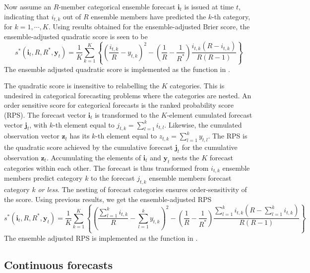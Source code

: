 \documentclass[article]{jss}
\begin{document}
Now assume an $R$-member categorical ensemble forecast $\mathbf{i}_t$ is issued at time $t$, indicating that $i_{t,k}$ out of $R$ ensemble members have predicted the $k$-th category, for $k=1,\cdots,K$.
Using results obtained for the ensemble-adjusted Brier score, the ensemble-adjusted quadratic score is seen to be
%
\begin{equation}
s^*(\mathbf{i}_t, R, R^*, \mathbf{y}_t) = \frac{1}{K} \sum_{k=1}^K \left\{ \left(\frac{i_{t,k}}{R} - y_{t,k}\right)^2 - \left(\frac{1}{R} - \frac{1}{R^*}\right) \frac{i_{t,k}(R-i_{t,k})}{R(R-1)}\right\}
\end{equation}
%
The ensemble adjusted quadratic score is implemented as the function  in .


The quadratic score is insensitive to relabelling the $K$ categories.
This is undesired in categorical forecasting problems where the categories are nested.
An order sensitive score for categorical forecasts is the ranked probability score (RPS).
The forecast vector $\mathbf{i}_t$ is transformed to the $K$-element cumulated forecast vector $\mathbf{j}_t$, with $k$-th element equal to $j_{t,k} = \sum_{l=1}^k i_{t,l}$.
Likewise, the cumulated observation vector $\mathbf{z}_t$ has its $k$-th element equal to $z_{t,k} = \sum_{l=1}^k y_{t,l}$.
The RPS is the quadratic score achieved by the cumulative forecast $\mathbf{j}_t$ for the cumulative observation $\mathbf{z}_t$.
Accumulating the elements of $\mathbf{i}_t$ and $\mathbf{y}_t$ nests the $K$ forecast categories within each other. 
The forecast is thus transformed from $i_{t,k}$ ensemble members predict category $k$ to the forecast $j_{t,k}$ ensemble members forecast category $k$ \emph{or less}.
The nesting of forecast categories ensures order-sensitivity of the score.
Using previous results, we get the ensemble-adjusted RPS
%
\begin{equation}
s^*(\mathbf{i}_t, R, R^*, \mathbf{y}_t) = \frac{1}{K} \sum_{k=1}^K \left\{ \left(\frac{\sum_{l=1}^k i_{t,k}}{R} - \sum_{l=1}^k y_{t,k}\right)^2 - \left(\frac{1}{R} - \frac{1}{R^*}\right) \frac{\sum_{l=1}^k i_{t,k}(R-\sum_{l=1}^k i_{t,k})}{R(R-1)}\right\}
\end{equation}
%
The ensemble adjusted RPS is implemented as the function  in .






\subsection{Continuous forecasts}
\end{document}
